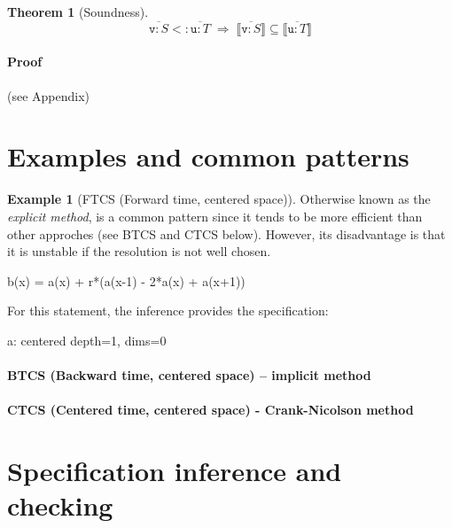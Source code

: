 \documentclass[9pt]{sigplanconf}
\newcounter{block}
\theoremstyle{definition}
\newtheorem{theorem}[block]{Theorem}
\newtheorem{example}[block]{Example}
\newcommand{\interp}[1]{\llbracket{#1}\rrbracket}
\begin{document}
\begin{theorem}[Soundness]
\[
\overline{\texttt{v} : S} <: \overline{\texttt{u} : T}
\; \Rightarrow \;
\interp{\overline{\texttt{v} : S}} \subseteq \interp{\overline{\texttt{u} : T}}
\]
\end{theorem}

\paragraph{Proof} (see Appendix)



\section{Examples and common patterns}

\begin{example}[FTCS (Forward time, centered space)]

  Otherwise known as the \emph{explicit method}, is a common
  pattern since it tends to be more efficient than other approches
  (see BTCS and CTCS below). However, its disadvantage is that it is
  unstable if the resolution is not well chosen.

\begin{ExmVerbatim}
b(x) = a(x) + r*(a(x-1) - 2*a(x) + a(x+1))
\end{ExmVerbatim}
%
For this statement, the inference provides the specification:
%
\begin{SpecVerbatim}
a: centered depth=1, dims=0
\end{SpecVerbatim}



\end{example}

\paragraph{BTCS (Backward time, centered space) -- implicit method}

\paragraph{CTCS (Centered time, centered space) - Crank-Nicolson method}

\section{Specification inference and checking}
\label{sec:analysis}
\end{document}
